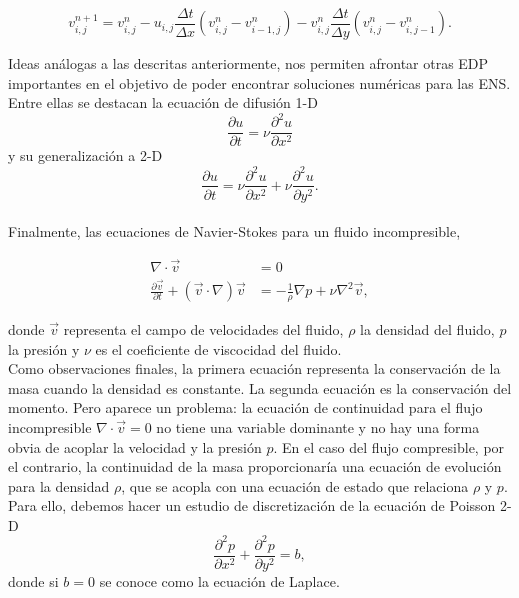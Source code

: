 \documentclass[A4,10pt]{article}
\begin{document}
\begin{multicols}{2}
$$v_{i,j}^{n+1} = v_{i,j}^n - u_{i,j} \frac{\Delta t}{\Delta x} (v_{i,j}^n-v_{i-1,j}^n) - v_{i,j}^n \frac{\Delta t}{\Delta y} (v_{i,j}^n-v_{i,j-1}^n).$$

Ideas análogas a las descritas anteriormente, nos permiten afrontar otras EDP importantes en el objetivo de poder encontrar soluciones numéricas para las ENS. Entre ellas se destacan la ecuación de difusión 1-D 
$$\frac{\partial u}{\partial t}= \nu \frac{\partial^2 u}{\partial x^2}$$
y su generalización a 2-D
$$\frac{\partial u}{\partial t} = \nu \frac{\partial ^2 u}{\partial x^2} + \nu \frac{\partial ^2 u}{\partial y^2}.$$
\\

Finalmente, las ecuaciones de Navier-Stokes para un fluido incompresible, 

\begin{equation*}
	\begin{split}
	\nabla \cdot\vec{v} &= 0 \\
	\frac{\partial \vec{v}}{\partial t}+(\vec{v}\cdot\nabla)\vec{v} &= -\frac{1}{\rho}\nabla p + \nu \nabla^2\vec{v},
	\end{split}
\end{equation*}

donde $\vec{v}$ representa el campo de velocidades del fluido, $\rho$ la densidad del fluido, $p$ la presión y $\nu$ es el coeficiente de viscocidad del fluido.\\

 Como observaciones finales, la primera ecuación representa la conservación de la masa cuando la densidad es constante. La segunda ecuación es la conservación del momento. Pero aparece un problema: la ecuación de continuidad para el flujo incompresible $ \nabla \cdot \vec{v} = 0 $ no tiene una variable dominante y no hay una forma obvia de acoplar la velocidad  y la presión $ p $. En el caso del flujo compresible, por el contrario, la continuidad de la masa proporcionaría una ecuación de evolución para la densidad $ \rho $, que se acopla con una ecuación de estado que relaciona $ \rho $ y $ p $. Para ello, debemos hacer un estudio de discretización de la ecuación de Poisson 2-D
$$\frac{\partial ^2 p}{\partial x^2} + \frac{\partial ^2 p}{\partial y^2} = b,$$
donde si $b=0$ se conoce como la ecuación de Laplace.

\end{multicols}
\end{document}
